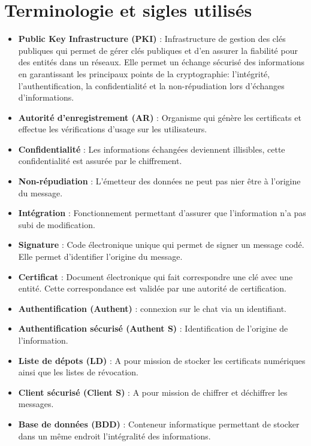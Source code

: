 \documentclass[a4paper,11pt,french]{article}
\begin{document}
\section{Terminologie et sigles utilisés}
\begin{itemize}
\item \textbf{Public Key Infrastructure (PKI)} : Infrastructure de gestion des clés publiques qui permet de gérer clés publiques et d'en assurer la fiabilité pour des entités dans un réseaux. Elle permet un échange sécurisé des informations en garantissant les principaux points de la cryptographie: l'intégrité, l'authentification, la confidentialité et la non-répudiation lors d'échanges d'informations.
\item \textbf{Autorité d'enregistrement (AR)} : Organisme qui génère les certificats et effectue les vérifications d'usage sur les utilisateurs.
\item \textbf{Confidentialité} : Les informations échangées deviennent illisibles, cette confidentialité est assurée par le chiffrement.
\item \textbf{Non-répudiation} : L'émetteur des données ne peut pas nier être à l'origine du message.
\item \textbf{Intégration} : Fonctionnement permettant d'assurer que l'information n'a pas subi de modification.
\item \textbf{Signature} : Code électronique unique qui permet de signer un message codé. Elle permet d'identifier l'origine du message.
\item \textbf{Certificat} : Document électronique qui fait correspondre une clé avec une entité. Cette correspondance est validée par une autorité de certification.
\item \textbf{Authentification (Authent)} : connexion sur le chat via un identifiant.
\item \textbf{Authentification sécurisé (Authent S)} : Identification de l'origine de l'information.
\item \textbf{Liste de dépots (LD)} :  A pour mission de stocker les certificats numériques ainsi que les listes de révocation. 
\item \textbf{Client sécurisé (Client S)} :  A pour mission de chiffrer et déchiffrer les messages.
\item \textbf{Base de données (BDD)} : Conteneur informatique permettant de stocker dans un même endroit l'intégralité des informations.

\end{itemize}
\end{document}
